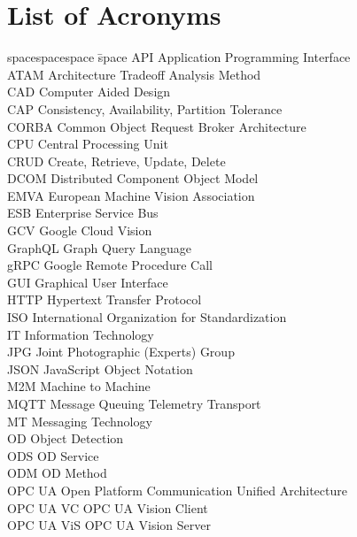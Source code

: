 \chapter*{List of Acronyms}
\begin{tabbing}
spacespacespace \= space \kill
API	 \> 	Application Programming Interface	 \\
ATAM	 \> 	Architecture Tradeoff Analysis Method	 \\
CAD	 \> 	Computer Aided Design	 \\
CAP	 \> 	Consistency, Availability, Partition Tolerance	 \\
CORBA	 \> 	Common Object Request Broker Architecture 	 \\
CPU	 \> 	Central Processing Unit	 \\
CRUD	 \> 	Create, Retrieve, Update, Delete	 \\
DCOM	 \> 	Distributed Component Object Model	 \\
EMVA \> European Machine Vision Association\\
ESB	\>	Enterprise Service Bus \\
GCV	\>	Google Cloud Vision \\
GraphQL     \>  Graph Query Language\\
gRPC     \>  Google Remote Procedure Call\\
GUI	\>	Graphical User Interface \\
HTTP	 \> 	Hypertext Transfer Protocol	 \\
ISO    \>  International Organization for Standardization\\
IT  \>  Information Technology\\
JPG	\>	Joint Photographic (Experts) Group \\
JSON	\>	JavaScript Object Notation \\
M2M	\>	Machine to Machine \\
MQTT     \>  Message Queuing Telemetry Transport\\
MT      \> Messaging Technology\\
OD     \>  Object Detection\\
ODS     \>  OD Service\\
ODM     \>  OD Method\\
OPC UA     \>  Open Platform Communication Unified Architecture\\
OPC UA VC    \>  OPC UA Vision Client\\
OPC UA ViS    \>  OPC UA Vision Server\\

\end{tabbing}
